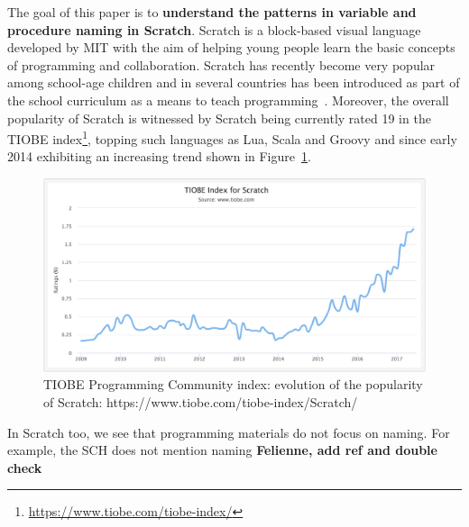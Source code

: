 \documentclass[conference]{IEEEtran}
\newcommand{\todo}[1]{ \textbf{#1} }
\begin{document}

The goal of this paper is to \textbf{understand the patterns in variable and procedure naming in Scratch}. Scratch is a block-based visual language developed by MIT with the aim of helping young people learn the basic concepts of programming and collaboration. 
Scratch has recently become very popular among school-age children and in several countries has been introduced as part of the school curriculum as a means to teach programming~\cite{vanZyl,SaezLopez}.
Moreover, the overall popularity of Scratch is witnessed by Scratch being currently rated 19 in the TIOBE index\footnote{\url{https://www.tiobe.com/tiobe-index/}}, topping such languages as Lua, Scala and Groovy and since early 2014 exhibiting an increasing trend shown in Figure~\ref{fig:tiobe}.
\begin{figure}
  \begin{center}
  \includegraphics[width=\columnwidth]{fig/tiobe}
  \caption{TIOBE Programming Community index: evolution of the popularity of Scratch: https://www.tiobe.com/tiobe-index/Scratch/}
  \label{fig:tiobe}
  \end{center}
\end{figure} 

In Scratch too, we see that programming materials do not focus on naming. For example, the SCH does not mention naming \todo{Felienne, add ref and double check}
\end{document}

